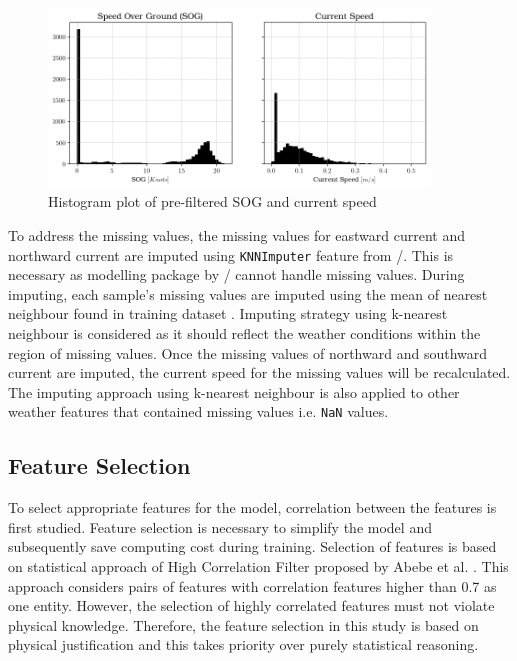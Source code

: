 \begin{figure}[h]
    \centering
        \includegraphics[width=0.9\textwidth]{02_figures/sog_curspeed_anomalies.png}
        \caption{Histogram plot of pre-filtered SOG and current speed}
        \label{fig:anomalies_sog_curspeed}
\end{figure}

To address the missing values, the missing values for eastward current and northward current are imputed using {\tt KNNImputer} feature from \scikit/. This is necessary as modelling package by \scikit/ cannot handle missing values. During imputing, each sample's missing values are imputed using the mean of nearest neighbour found in training dataset . Imputing strategy using k-nearest neighbour is considered as it should reflect the weather conditions within the region of missing values. Once the missing values of northward and southward current are imputed, the current speed for the missing values will be recalculated. The imputing approach using k-nearest neighbour is also applied to other weather features that contained missing values i.e. {\tt NaN} values.\\

\subsection{Feature Selection}\label{sec:feature_select}

To select appropriate features for the model, correlation between the features is first studied. Feature selection is necessary to simplify the model and subsequently save computing cost during training. Selection of features is based on statistical approach of High Correlation Filter proposed by Abebe et al. . This approach considers pairs of features with correlation features higher than 0.7 as one entity. However, the selection of highly correlated features must not violate physical knowledge. Therefore, the feature selection in this study is based on physical justification and this takes priority over purely statistical reasoning.\\

